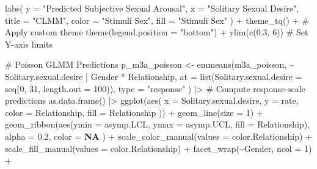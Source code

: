 \documentclass[
  bookmarksnumbered]{article}
\newenvironment{Shaded}{\begin{snugshade}}{\end{snugshade}}
\newcommand{\AttributeTok}[1]{\textcolor[rgb]{0.80,0.80,0.80}{#1}}
\newcommand{\CommentTok}[1]{\textcolor[rgb]{0.50,0.62,0.50}{#1}}
\newcommand{\ConstantTok}[1]{\textcolor[rgb]{0.86,0.64,0.64}{\textbf{#1}}}
\newcommand{\DecValTok}[1]{\textcolor[rgb]{0.86,0.86,0.80}{#1}}
\newcommand{\FloatTok}[1]{\textcolor[rgb]{0.75,0.75,0.82}{#1}}
\newcommand{\FunctionTok}[1]{\textcolor[rgb]{0.94,0.94,0.56}{#1}}
\newcommand{\NormalTok}[1]{\textcolor[rgb]{0.80,0.80,0.80}{#1}}
\newcommand{\OtherTok}[1]{\textcolor[rgb]{0.94,0.94,0.56}{#1}}
\newcommand{\SpecialCharTok}[1]{\textcolor[rgb]{0.86,0.64,0.64}{#1}}
\newcommand{\StringTok}[1]{\textcolor[rgb]{0.80,0.58,0.58}{#1}}
\begin{document}
\begin{Shaded}
\begin{Highlighting}[]
  \FunctionTok{labs}\NormalTok{(}
    \AttributeTok{y =} \StringTok{"Predicted Subjective Sexual Arousal"}\NormalTok{, }\AttributeTok{x =} \StringTok{"Solitary Sexual Desire"}\NormalTok{,}
    \AttributeTok{title =} \StringTok{"CLMM"}\NormalTok{,}
    \AttributeTok{color =} \StringTok{"Stimuli Sex"}\NormalTok{, }\AttributeTok{fill =} \StringTok{"Stimuli Sex"}
\NormalTok{  ) }\SpecialCharTok{+}
  \FunctionTok{theme\_tq}\NormalTok{() }\SpecialCharTok{+} \CommentTok{\# Apply custom theme}
  \FunctionTok{theme}\NormalTok{(}\AttributeTok{legend.position =} \StringTok{"bottom"}\NormalTok{) }\SpecialCharTok{+}
  \FunctionTok{ylim}\NormalTok{(}\FunctionTok{c}\NormalTok{(}\FloatTok{0.3}\NormalTok{, }\DecValTok{6}\NormalTok{)) }\CommentTok{\# Set Y{-}axis limits}

\CommentTok{\# Poisson GLMM Predictions}
\NormalTok{p\_m3a\_poisson }\OtherTok{\textless{}{-}} \FunctionTok{emmeans}\NormalTok{(m3a\_poisson, }\SpecialCharTok{\textasciitilde{}}\NormalTok{ Solitary.sexual.desire }\SpecialCharTok{|}\NormalTok{ Gender }\SpecialCharTok{*}\NormalTok{ Relationship,}
  \AttributeTok{at =} \FunctionTok{list}\NormalTok{(}\AttributeTok{Solitary.sexual.desire =} \FunctionTok{seq}\NormalTok{(}\DecValTok{0}\NormalTok{, }\DecValTok{31}\NormalTok{, }\AttributeTok{length.out =} \DecValTok{100}\NormalTok{)),}
  \AttributeTok{type =} \StringTok{"response"}
\NormalTok{) }\SpecialCharTok{|\textgreater{}} \CommentTok{\# Compute response{-}scale predictions}
  \FunctionTok{as.data.frame}\NormalTok{() }\SpecialCharTok{|\textgreater{}}
  \FunctionTok{ggplot}\NormalTok{(}\FunctionTok{aes}\NormalTok{(}
    \AttributeTok{x =}\NormalTok{ Solitary.sexual.desire, }\AttributeTok{y =}\NormalTok{ rate,}
    \AttributeTok{color =}\NormalTok{ Relationship, }\AttributeTok{fill =}\NormalTok{ Relationship}
\NormalTok{  )) }\SpecialCharTok{+}
  \FunctionTok{geom\_line}\NormalTok{(}\AttributeTok{size =} \DecValTok{1}\NormalTok{) }\SpecialCharTok{+}
  \FunctionTok{geom\_ribbon}\NormalTok{(}\FunctionTok{aes}\NormalTok{(}\AttributeTok{ymin =}\NormalTok{ asymp.LCL, }\AttributeTok{ymax =}\NormalTok{ asymp.UCL, }\AttributeTok{fill =}\NormalTok{ Relationship),}
    \AttributeTok{alpha =} \FloatTok{0.2}\NormalTok{, }\AttributeTok{color =} \ConstantTok{NA}
\NormalTok{  ) }\SpecialCharTok{+}
  \FunctionTok{scale\_color\_manual}\NormalTok{(}\AttributeTok{values =}\NormalTok{ color.Relationship) }\SpecialCharTok{+}
  \FunctionTok{scale\_fill\_manual}\NormalTok{(}\AttributeTok{values =}\NormalTok{ color.Relationship) }\SpecialCharTok{+}
  \FunctionTok{facet\_wrap}\NormalTok{(}\SpecialCharTok{\textasciitilde{}}\NormalTok{Gender, }\AttributeTok{ncol =} \DecValTok{1}\NormalTok{) }\SpecialCharTok{+}

\end{Highlighting}
\end{Shaded}
\end{document}

